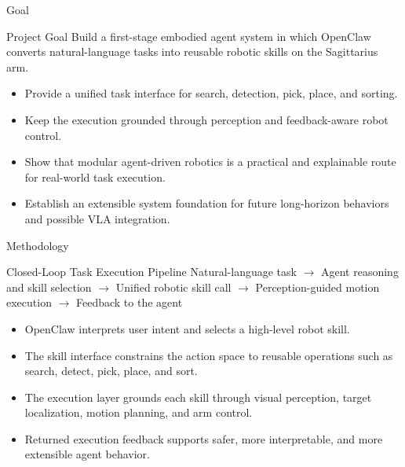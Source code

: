 \documentclass[aspectratio=169]{beamer}
\begin{document}
\begin{frame}{Goal}
  \begin{block}{Project Goal}
    Build a first-stage embodied agent system in which OpenClaw converts natural-language tasks into reusable robotic skills on the Sagittarius arm.
  \end{block}

  \vspace{0.5em}

  \begin{itemize}
    \item Provide a unified task interface for search, detection, pick, place, and sorting.
    \item Keep the execution grounded through perception and feedback-aware robot control.
    \item Show that modular agent-driven robotics is a practical and explainable route for real-world task execution.
    \item Establish an extensible system foundation for future long-horizon behaviors and possible VLA integration.
  \end{itemize}
\end{frame}

\begin{frame}{Methodology}
  \begin{block}{Closed-Loop Task Execution Pipeline}
    \centering
    Natural-language task $\rightarrow$ Agent reasoning and skill selection $\rightarrow$ Unified robotic skill call $\rightarrow$ Perception-guided motion execution $\rightarrow$ Feedback to the agent
  \end{block}

  \vspace{0.5em}

  \begin{itemize}
    \item OpenClaw interprets user intent and selects a high-level robot skill.
    \item The skill interface constrains the action space to reusable operations such as search, detect, pick, place, and sort.
    \item The execution layer grounds each skill through visual perception, target localization, motion planning, and arm control.
    \item Returned execution feedback supports safer, more interpretable, and more extensible agent behavior.
  \end{itemize}
\end{frame}
\end{document}
